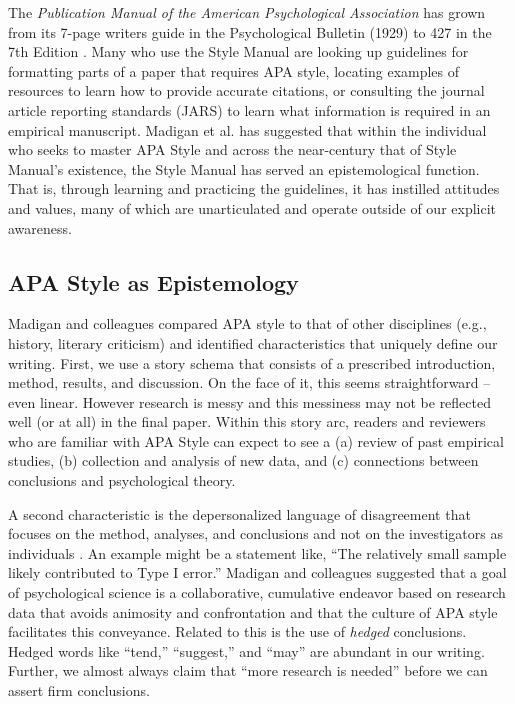 \documentclass[
  11pt,
]{book}
\begin{document}
The \emph{Publication Manual of the American Psychological Association} has grown from its 7-page writers guide in the Psychological Bulletin (1929) to 427 in the 7th Edition \citep{american_psychological_association_publication_2020}. Many who use the Style Manual are looking up guidelines for formatting parts of a paper that requires APA style, locating examples of resources to learn how to provide accurate citations, or consulting the journal article reporting standards (JARS) to learn what information is required in an empirical manuscript. Madigan et al. \citeyearpar{madigan_language_1995} has suggested that within the individual who seeks to master APA Style and across the near-century that of Style Manual's existence, the Style Manual has served an epistemological function. That is, through learning and practicing the guidelines, it has instilled attitudes and values, many of which are unarticulated and operate outside of our explicit awareness.

\hypertarget{apa-style-as-epistemology}{%
\subsection{APA Style as Epistemology}\label{apa-style-as-epistemology}}

Madigan \citeyearpar{madigan_language_1995} and colleagues compared APA style to that of other disciplines (e.g., history, literary criticism) and identified characteristics that uniquely define our writing. First, we use a story schema that consists of a prescribed introduction, method, results, and discussion. On the face of it, this seems straightforward -- even linear. However research is messy and this messiness may not be reflected well (or at all) in the final paper. Within this story arc, readers and reviewers who are familiar with APA Style can expect to see a (a) review of past empirical studies, (b) collection and analysis of new data, and (c) connections between conclusions and psychological theory.

A second characteristic is the depersonalized language of disagreement that focuses on the method, analyses, and conclusions and not on the investigators as individuals \citep{madigan_language_1995}. An example might be a statement like, ``The relatively small sample likely contributed to Type I error.'' Madigan and colleagues suggested that a goal of psychological science is a collaborative, cumulative endeavor based on research data that avoids animosity and confrontation and that the culture of APA style facilitates this conveyance. Related to this is the use of \emph{hedged} conclusions. Hedged words like ``tend,'' ``suggest,'' and ``may'' are abundant in our writing. Further, we almost always claim that ``more research is needed'' before we can assert firm conclusions.
\end{document}
